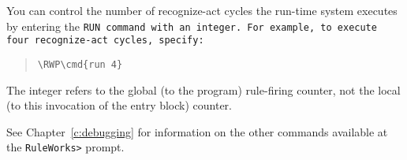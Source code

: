 You can control the number of recognize-act cycles the run-time system
executes by entering the \tt{RUN} command with an integer. For
example, to execute four recognize-act cycles, specify:

\begin{quote}
\begin{Verbatim}[commandchars=\\\{\}]
\RWP\cmd{run 4}
\end{Verbatim}
\end{quote}

The integer refers to the global (to the program) rule-firing counter,
not the local (to this invocation of the entry block) counter.

See Chapter~\ref{c:debugging} for information on the other commands
available at the \verb|RuleWorks>| prompt.

